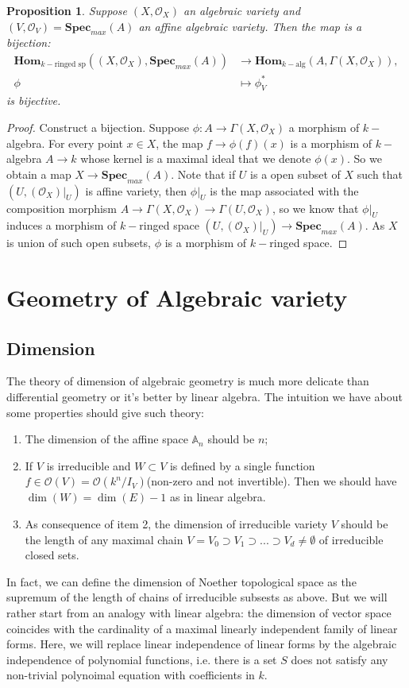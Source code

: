 \documentclass[12pt,a4paper,english]{article}
\theoremstyle{plain}
\newtheorem{prop}[thm]{Proposition}
\theoremstyle{definition}
\theoremstyle{remark}
\newcommand{\homo}{\mathbf{Hom}}
\newcommand{\spm}{\mathbf{Spec}_{max}}
\begin{document}
\begin{prop}
Suppose $(X,\mathcal{O}_{X})$ an algebraic variety and $(V,\mathcal{O}_{V})=\spm(A)$ an affine algebraic variety. Then the map is a bijection:
\begin{align*}
        \homo_{k-\text{ringed sp}}((X,\mathcal{O}_{X}),\spm(A))&\rightarrow\homo_{k-\text{alg}}(A,\Gamma(X,\mathcal{O}_{X})),\\
        \phi&\mapsto \phi^{*}_{V}
\end{align*}
is bijective.
\end{prop}
\begin{proof}
Construct a bijection. Suppose $\phi:A\rightarrow\Gamma(X,\mathcal{O}_{X})$ a morphism of $k-$algebra. For every point $x\in X$, the map $f\rightarrow \phi(f)(x)$ is a morphism of $k-$algebra $A\rightarrow k$ whose kernel is a maximal ideal that we denote $\phi(x)$. So we obtain a map $X\rightarrow \spm(A)$. Note that if $U$ is a open subset of $X$ such that $(U,(\mathcal{O}_{X})|_{U})$ is affine variety, then $\phi|_{U}$ is the map associated with the composition morphism $A\rightarrow \Gamma(X,\mathcal{O}_{X})\rightarrow\Gamma(U,\mathcal{O}_{X})$, so we know that $\phi|_{U}$ induces a morphism of $k-$ringed space $(U,(\mathcal{O}_{X})|_{U})\rightarrow\spm(A)$. As $X$ is union of such open subsets, $\phi$ is a morphism of $k-$ringed space. 
\end{proof}
\section{Geometry of Algebraic variety}
\subsection{Dimension}
The theory of dimension of algebraic geometry is much more delicate than differential geometry or it's better by linear algebra. The intuition we have about some properties should give such theory:
\begin{enumerate}
    \item The dimension of the affine space $\mathbb{A}_{n}$ should be $n$;
    \item If $V$ is irreducible and $W\subset V$ is defined by a single function $f\in\mathcal{O}(V)=\mathcal{O}(k^{n}/I_{V})$(non-zero and not invertible). Then we should have $\dim(W)=\dim(E)-1$ as in linear algebra.
    \item As consequence of item 2, the dimension of irreducible variety $V$ should be the length of any maximal chain $V=V_{0}\supset V_{1}\supset...\supset V_{d}\not=\emptyset$ of irreducible closed sets.
\end{enumerate}
In fact, we can define the dimension of Noether topological space as the supremum of the length of chains of irreducible subsests as above. But we will rather start from an analogy with linear algebra: the dimension of vector space coincides with the cardinality of a maximal linearly independent family of linear forms. Here, we will replace linear independence of linear forms by the algebraic independence of polynomial functions, i.e. there is a set $S$ does not satisfy any non-trivial polynoimal equation with coefficients in $k$.
\end{document}
